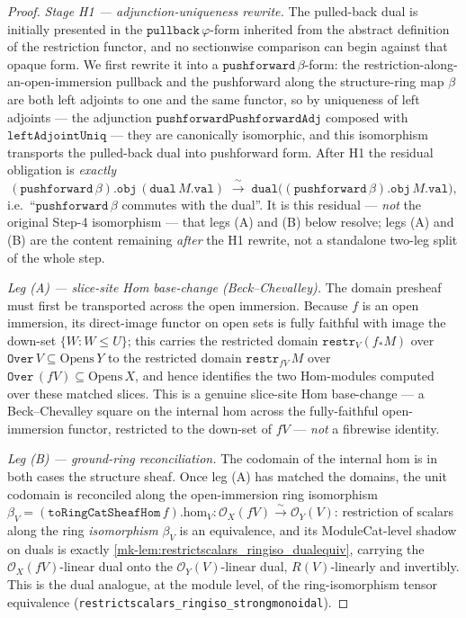\begin{proof}
  \emph{Stage H1 --- adjunction-uniqueness rewrite.} The pulled-back dual is initially
  presented in the \(\mathtt{pullback}\,\varphi\)-form inherited from the abstract
  definition of the restriction functor, and no sectionwise comparison can begin against
  that opaque form. We first rewrite it into a \(\mathtt{pushforward}\,\beta\)-form: the
  restriction-along-an-open-immersion pullback and the pushforward along the structure-ring
  map \(\beta\) are both left adjoints to one and the same functor, so by uniqueness of left
  adjoints --- the adjunction \(\mathtt{pushforwardPushforwardAdj}\) composed with
  \(\mathtt{leftAdjointUniq}\) --- they are canonically isomorphic, and this isomorphism
  transports the pulled-back dual into pushforward form. After H1 the residual obligation is
  \emph{exactly}
  \[
    (\mathtt{pushforward}\,\beta).\mathtt{obj}\,(\mathtt{dual}\,M.\mathtt{val})
      \;\xrightarrow{\ \sim\ }\;
    \mathtt{dual}\bigl((\mathtt{pushforward}\,\beta).\mathtt{obj}\,M.\mathtt{val}\bigr),
  \]
  i.e.\ ``\(\mathtt{pushforward}\,\beta\) commutes with the dual''. It is this residual ---
  \emph{not} the original Step-4 isomorphism --- that legs (A) and (B) below resolve; legs
  (A) and (B) are the content remaining \emph{after} the H1 rewrite, not a standalone
  two-leg split of the whole step.

  \emph{Leg (A) --- slice-site Hom base-change (Beck--Chevalley).} The domain presheaf must
  first be transported across the open immersion. Because \(f\) is an open immersion, its
  direct-image functor on open sets is fully faithful with image
  the down-set \(\{W : W \le U\}\); this carries the restricted domain
  \(\mathtt{restr}_V(f_*M)\) over \(\mathtt{Over}\,V \subseteq \mathrm{Opens}\,Y\) to the
  restricted domain \(\mathtt{restr}_{fV}\,M\) over \(\mathtt{Over}\,(fV) \subseteq
  \mathrm{Opens}\,X\), and hence identifies the two Hom-modules computed over these matched
  slices. This is a genuine slice-site Hom base-change --- a Beck--Chevalley square on the
  internal hom across the fully-faithful open-immersion functor, restricted to the down-set
  of \(fV\) --- \emph{not} a fibrewise identity.

  \emph{Leg (B) --- ground-ring reconciliation.} The codomain of the internal hom is in
  both cases the structure sheaf. Once leg (A) has matched the domains, the unit codomain
  is reconciled along the open-immersion ring isomorphism
  \(\beta_V = (\mathtt{toRingCatSheafHom}\,f).\mathrm{hom}_V \colon
  \mathcal{O}_X(fV) \xrightarrow{\sim} \mathcal{O}_Y(V)\): restriction of scalars along the
  ring \emph{isomorphism} \(\beta_V\) is an equivalence, and its ModuleCat-level
  shadow on duals is exactly \ref{mk-lem:restrictscalars_ringiso_dualequiv}, carrying the
  \(\mathcal{O}_X(fV)\)-linear dual onto the \(\mathcal{O}_Y(V)\)-linear dual,
  \(R(V)\)-linearly and invertibly. This is the dual analogue, at the module level, of the
  ring-isomorphism tensor equivalence (\texttt{restrictscalars\_ringiso\_strongmonoidal}).


\end{proof}

